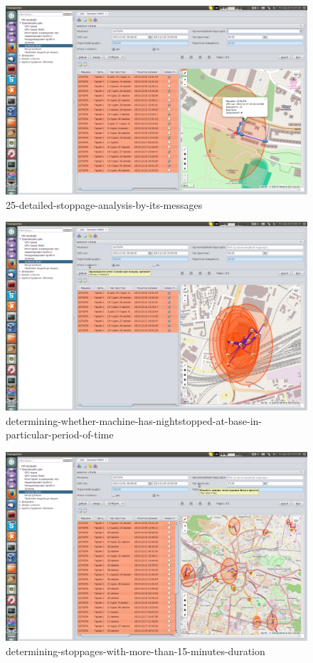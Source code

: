\begin{figure}[!htp]
\centering
\includegraphics[width=16cm]{chapters/03-stoppages/images/25-detailed-stoppage-analysis-by-its-messages.png}
\caption{25-detailed-stoppage-analysis-by-its-messages}\label{fig:25}
\end{figure}

\begin{figure}[!htp]
\centering
\includegraphics[width=16cm]{chapters/03-stoppages/images/26-determining-whether-machine-has-nightstopped-at-base-in-particular-period-of-time.png}
\caption{determining-whether-machine-has-nightstopped-at-base-in-particular-period-of-time}\label{fig:26}
\end{figure}

\begin{figure}[!htp]
\centering
\includegraphics[width=16cm]{chapters/03-stoppages/images/27-determining-stoppages-with-more-than-15-minutes-duration.png}
\caption{determining-stoppages-with-more-than-15-minutes-duration}\label{fig:27}
\end{figure}